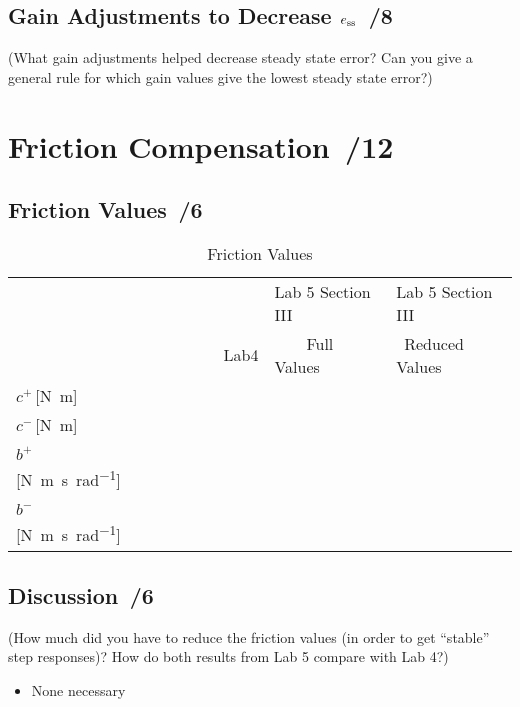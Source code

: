 \documentclass{article}
\newcommand{\score}{\hfill \underline{\hspace{0.65cm}}\,/} %
\begin{document}
\subsection{Gain Adjustments to Decrease $e_{\rm ss}$ \score 8}
(What gain adjustments helped decrease steady state error? Can you give a general rule for which gain values give the lowest steady state error?)

\section{Friction Compensation \score 12}
\subsection{Friction Values \score 6}
\begin{table}[phtb]\footnotesize \label{tbl:lab5_q4}
\begin{center}
\caption{Friction Values}
\begin{tabular}{l|m{2.5cm}|m{2.5cm}|m{2.5cm}} \hline \hline
\cellcolor{lightgray} &\cellcolor{lightgray}  &\cellcolor{lightgray} Lab 5 Section III & \cellcolor{lightgray} Lab 5 Section III \\
\cellcolor{lightgray}&\multirow{-2}{*}{\cellcolor{lightgray}~~~~~~~~~Lab4} & \cellcolor{lightgray}~~~~Full Values &\cellcolor{lightgray} ~Reduced Values \\
\hline
$c^+$\,[\si{\newton\meter}] & & &  \\ \hline
$c^-$\,[\si{\newton\meter}] & & &  \\ \hline
$b^+$\,[\si{\newton\meter\second\per\radian}] & & & \\ \hline
$b^-$\,[\si{\newton\meter\second\per\radian}] & & & \\ \hline
\end{tabular}
\end{center}
\end{table}

\subsection{Discussion \score 6}
(How much did you have to reduce the friction values (in order to get ``stable'' step responses)? How do both results from Lab 5 compare with Lab 4?)
\newline \\[3mm]
\begin{itemize}
\item None necessary %
\end{itemize}
\end{document}
